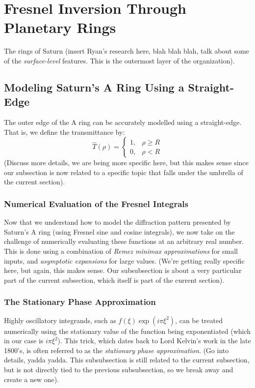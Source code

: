 \documentclass{article}
\theoremstyle{normal}
\begin{document}
    \section{Fresnel Inversion Through Planetary Rings}
        The rings of Saturn (insert Ryan's research here, blah blah blah,
        talk about some of the \textit{surface-level} features. This is the
        outermost layer of the organization).
        \subsection{Modeling Saturn's A Ring Using a Straight-Edge}
            The outer edge of the A ring can be accurately modelled using
            a straight-edge. That is, we define the transmittance by:
            \begin{equation}
                \hat{T}(\rho)=
                \begin{cases}
                    1,&\rho\geq{R}\\
                    0,&\rho<R
                \end{cases}
            \end{equation}
            (Discuss more details, we are being more specific here, but this
            makes sense since our subsection is now related to a
            specific topic that falls under the umbrella of the current
            section).
            \subsubsection{Numerical Evaluation of the Fresnel Integrals}
                Now that we understand how to model the diffraction pattern
                presented by Saturn's A ring (using Fresnel sine and cosine
                integrals), we now take on the challenge of numerically
                evaluating these functions at an arbitrary real number. This
                is done using a combination of
                \textit{Remez minimax approximations} for small inputs, and
                \textit{asymptotic expansions} for large values.
                (We're getting really specific here, but again, this makes
                sense. Our subsubsection is about a very particular part of
                the current subsection, which itself is part of the current
                section).
            \subsubsection{The Stationary Phase Approximation}
                Highly oscillatory integrands, such as
                $f(\xi)\exp(i\pi\xi^{2})$, can be treated numerically using
                the stationary value of the function being exponentiated
                (which in our case is $i\pi\xi^{2}$). This trick, which dates
                back to Lord Kelvin's work in the late 1800's, is often
                referred to as the \textit{stationary phase approximation}.
                (Go into details, yadda yadda. This subsubsection is still
                related to the current subsection, but is not directly
                tied to the previous subsubsection, so we break away and
                create a new one).
\end{document}
